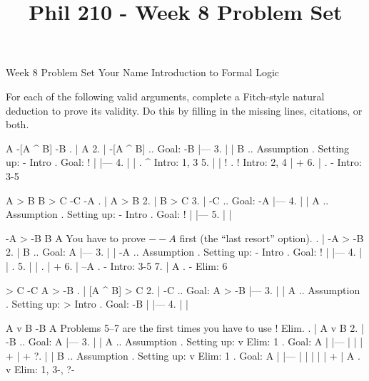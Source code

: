 
\title{Phil 210 - Week 8 Problem Set}

\heading
Week 8 Problem Set
Your Name
Introduction to Formal Logic
\endheading

For each of the following valid arguments, complete a Fitch-style natural deduction to prove its validity. Do this by filling in the missing lines, citations, or both.

\problems
{}
\argument
 A
 -[A ^ B]
\argumentline
 -B
\endargument
        \answer
        . | A
         2. | -[A ^ B]   ..  Goal: -B
            |---
         3. |   | B      ..  Assumption  .  Setting up: - Intro  .  Goal: !
            |   |---
         4. |   |        .  ^ Intro: 1, 3
         5. |   | !      .  ! Intro: 2, 4
            |   +
         6. |            .  - Intro: 3-5
        \endfitchproof
        \endanswer

\argument
 A > B
 B > C
 -C
\argumentline
 -A
\endargument
        \answer
        . | A > B
         2. | B > C
         3. | -C      ..  Goal: -A
            |---
         4. |   | A   ..  Assumption  .  Setting up: - Intro  .  Goal: !
            |   |---
         5. |   | 
        \endfitchproof
        \endanswer

\argument
 -A > -B
 B
\argumentline
 A
\endargument
\Hint You have to prove $--A$ first (the ``last resort'' option).
        \answer
        . | -A > -B
         2. | B        ..  Goal: A
            |---
         3. |   | -A   ..  Assumption  .  Setting up: - Intro  .  Goal: !
            |   |---
         4. |   |      .  
         5. |   |      .  
            |   +
         6. | --A      .  - Intro: 3-5
         7. | A        .  - Elim: 6
        \endfitchproof
        \endanswer

\argument
 [A ^ B] > C
 -C
\argumentline
 A > -B
\endargument
        \answer
        . | [A ^ B] > C
         2. | -C            .. Goal: A > -B
            |---
         3. |   | A         ..  Assumption  .  Setting up: > Intro  .  Goal: -B
            |   |---
         4. |   | 
        \endfitchproof
        \endanswer

\widerfitchsetup
{}
\argument
 A v B
 -B
\argumentline
 A
\endargument
\Hint Problems 5--7 are the first times you have to use $!$ Elim.
        \answer
        . | A v B
         2. | -B      ..  Goal: A
            |---
         3. |   | A   ..  Assumption  .  Setting up: v Elim: 1  .  Goal: A
            |   |---
            |   | 
            |   +
            |   +
         ?. |   | B   ..  Assumption  .  Setting up: v Elim: 1  .  Goal: A
            |   |---
            |   | 
            |   | 
            |   +
            | A       .  v Elim: 1, 3-, ?-
        \endfitchproof
        \endanswer

